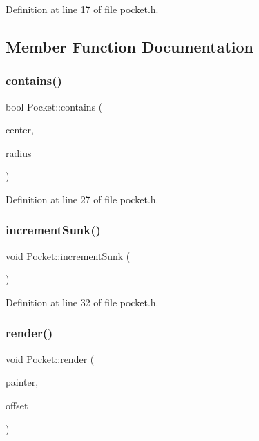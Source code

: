 Definition at line 17 of file pocket.\+h.



\subsection{Member Function Documentation}
\mbox{\label{class_pocket_ac01b76c9853e24904296d467ceeaa821}} 
\subsubsection{\texorpdfstring{contains()}{contains()}}
{\footnotesize\ttfamily bool Pocket\+::contains (\begin{DoxyParamCaption}\item[{const Q\+Vector2D \&}]{center,  }\item[{const double \&}]{radius }\end{DoxyParamCaption})\hspace{0.3cm}{\ttfamily [inline]}}



Definition at line 27 of file pocket.\+h.

\mbox{\label{class_pocket_a4ba8a5305df04f95a25a6c7027b05c2b}} 
\subsubsection{\texorpdfstring{increment\+Sunk()}{incrementSunk()}}
{\footnotesize\ttfamily void Pocket\+::increment\+Sunk (\begin{DoxyParamCaption}{ }\end{DoxyParamCaption})\hspace{0.3cm}{\ttfamily [inline]}}



Definition at line 32 of file pocket.\+h.

\mbox{\label{class_pocket_ab6114f9e08389b3ccdba3676275479e7}} 
\subsubsection{\texorpdfstring{render()}{render()}}
{\footnotesize\ttfamily void Pocket\+::render (\begin{DoxyParamCaption}\item[{Q\+Painter \&}]{painter,  }\item[{const Q\+Vector2D \&}]{offset }\end{DoxyParamCaption})}



